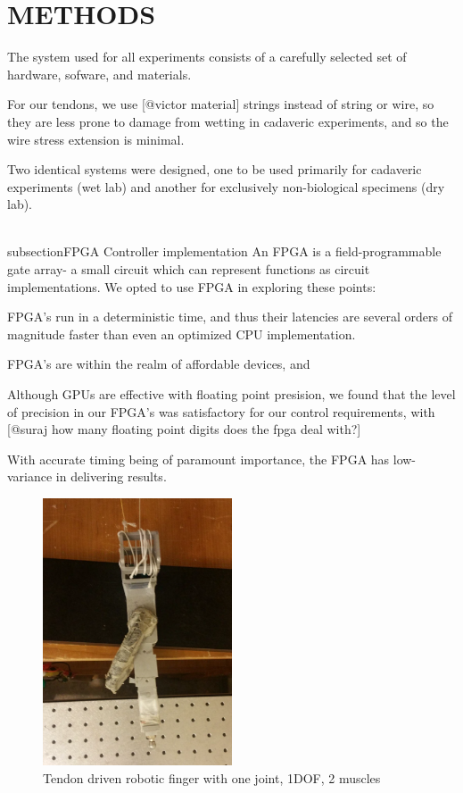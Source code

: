 \section{METHODS}

 The system used for all experiments consists of a carefully selected set of hardware, sofware, and materials.

For our tendons, we use [@victor material] strings instead of string or wire, so they are less prone to damage from wetting in cadaveric experiments, and so the wire stress extension is minimal.

 Two identical systems were designed, one to be used primarily for cadaveric experiments (wet lab) and another for exclusively non-biological specimens (dry lab).

\\subsection{FPGA Controller implementation} %
\label{sub:fpga_controller_implementation}
An FPGA is a field-programmable gate array- a small circuit which can represent functions as circuit implementations.
We opted to use FPGA in exploring these points:
\item FPGA's run in a deterministic time, and thus their latencies are several orders of magnitude faster than even an optimized CPU implementation.
\item FPGA's are within the realm of affordable devices, and 
\item Although GPUs are effective with floating point presision, we found that the level of precision in our FPGA's was satisfactory for our control requirements, with [@suraj how many floating point digits does the fpga deal with?]
\item With accurate timing being of paramount importance, the FPGA has low-variance in delivering results.




\begin{figure}[schematic_finger_overhead]
  \label{fig:schematic_finger_overhead}
  \centering
  \includegraphics[width=0.5\textwidth]{figures/overhead_robotic_finger.pdf}
  \caption{Tendon driven robotic finger with one joint, 1DOF, 2 muscles}
\end{figure}

